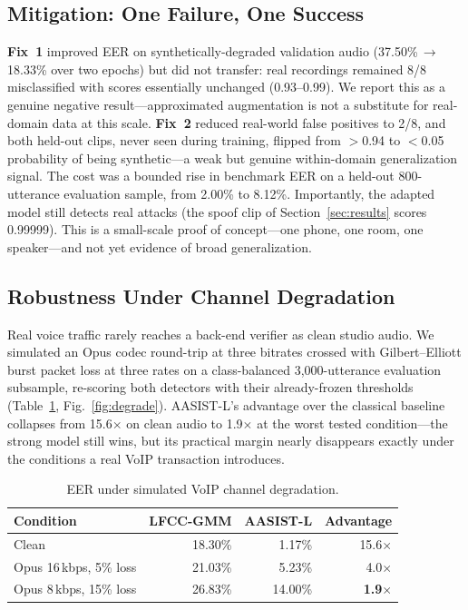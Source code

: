 \documentclass[conference]{IEEEtran}
\begin{document}
\subsection{Mitigation: One Failure, One Success}

\textbf{Fix~1} improved EER on synthetically-degraded validation audio
(37.50\%\,$\rightarrow$\,18.33\% over two epochs) but did not transfer: real
recordings remained 8/8 misclassified with scores essentially unchanged
(0.93--0.99). We report this as a genuine negative result---approximated
augmentation is not a substitute for real-domain data at this scale.
\textbf{Fix~2} reduced real-world false positives to 2/8, and both held-out
clips, never seen during training, flipped from $>$0.94 to $<$0.05 probability
of being synthetic---a weak but genuine within-domain generalization signal.
The cost was a bounded rise in benchmark EER on a held-out 800-utterance
evaluation sample, from 2.00\% to 8.12\%. Importantly, the adapted model still
detects real attacks (the spoof clip of Section~\ref{sec:results} scores
0.99999). This is a small-scale proof of concept---one phone, one room, one
speaker---and not yet evidence of broad generalization.

\subsection{Robustness Under Channel Degradation}

Real voice traffic rarely reaches a back-end verifier as clean studio audio. We
simulated an Opus codec round-trip at three bitrates crossed with
Gilbert--Elliott burst packet loss at three rates on a class-balanced
3{,}000-utterance evaluation subsample, re-scoring both detectors with their
already-frozen thresholds (Table~\ref{tab:voip}, Fig.~\ref{fig:degrade}).
AASIST-L's advantage over the classical baseline collapses from 15.6$\times$ on
clean audio to 1.9$\times$ at the worst tested condition---the strong model
still wins, but its practical margin nearly disappears exactly under the
conditions a real VoIP transaction introduces.

\begin{table}[t]
\caption{EER under simulated VoIP channel degradation.}
\label{tab:voip}
\centering
\footnotesize
\begin{tabular}{@{}lrrr@{}}
\toprule
\textbf{Condition} & \textbf{LFCC-GMM} & \textbf{AASIST-L} & \textbf{Advantage}\\
\midrule
Clean                     & 18.30\% & 1.17\%  & 15.6$\times$\\
Opus 16\,kbps, 5\% loss   & 21.03\% & 5.23\%  & 4.0$\times$\\
Opus 8\,kbps, 15\% loss   & 26.83\% & 14.00\% & \textbf{1.9$\times$}\\
\bottomrule
\end{tabular}
\end{table}
\end{document}
